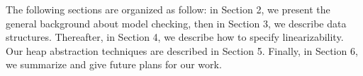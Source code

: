 The following sections are organized as follow: in Section 2, we present the general background about model checking, then in Section 3, we describe data structures. Thereafter, in Section 4, we describe how to specify linearizability.  Our heap abstraction techniques are described in Section 5. Finally, in Section 6, we summarize and give future plans for our work.

